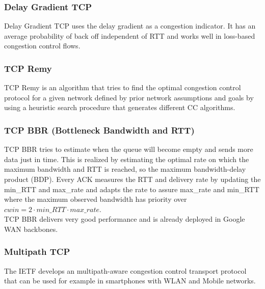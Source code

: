 \subsubsection*{Delay Gradient TCP}
Delay Gradient TCP uses the delay gradient as a congestion indicator.
It has an average probability of back off independent of RTT and works well in loss-based congestion control flows.

\subsubsection*{TCP Remy}
TCP Remy is an algorithm that tries to find the optimal congestion control protocol for a given network defined by prior network assumptions and goals by using a heuristic search procedure that generates different CC algorithms.

\subsubsection*{TCP BBR (Bottleneck Bandwidth and RTT)}
TCP BBR tries to estimate when the queue will become empty and sends more data just in time.
This is realized by estimating the optimal rate on which the maximum bandwidth and RTT is reached, so the maximum bandwidth-delay product (BDP).
Every ACK measures the RTT and delivery rate by updating the min\_RTT and max\_rate and adapts the rate to assure max\_rate and min\_RTT where the maximum observed bandwidth has priority over $cwin = 2 \cdot min\_RTT \cdot max\_rate$.\\
TCP BBR delivers very good performance and is already deployed in Google WAN backbones.

\subsubsection*{Multipath TCP}
The IETF develops an multipath-aware congestion control transport protocol that can be used for example in smartphones with WLAN and Mobile networks.

